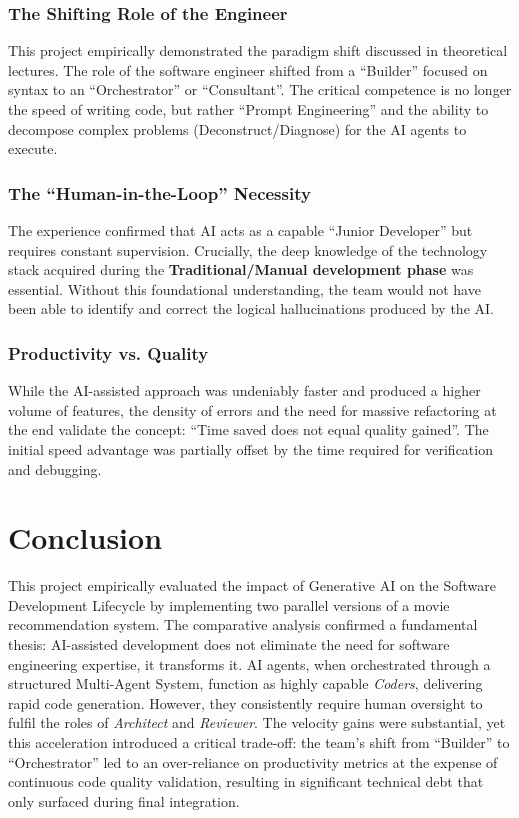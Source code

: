 \documentclass[a4paper,12pt]{report}
\begin{document}
    \subsection{The Shifting Role of the Engineer}
    This project empirically demonstrated the paradigm shift discussed in theoretical lectures. The role of the software engineer shifted from a ``Builder'' focused on syntax to an ``Orchestrator'' or ``Consultant''.
    The critical competence is no longer the speed of writing code, but rather ``Prompt Engineering'' and the ability to decompose complex problems (Deconstruct/Diagnose) for the AI agents to execute.

    \subsection{The ``Human-in-the-Loop'' Necessity}
    The experience confirmed that AI acts as a capable ``Junior Developer'' but requires constant supervision. Crucially, the deep knowledge of the technology stack acquired during the \textbf{Traditional/Manual development phase} was essential. Without this foundational understanding, the team would not have been able to identify and correct the logical hallucinations produced by the AI.

    \subsection{Productivity vs. Quality}
    While the AI-assisted approach was undeniably faster and produced a higher volume of features, the density of errors and the need for massive refactoring at the end validate the concept: ``Time saved does not equal quality gained''. The initial speed advantage was partially offset by the time required for verification and debugging.

\chapter{Conclusion}
This project empirically evaluated the impact of Generative AI on the Software Development Lifecycle by implementing two parallel versions of a movie recommendation system. The comparative analysis confirmed a fundamental thesis: AI-assisted development does not eliminate the need for software engineering expertise, it transforms it. AI agents, when orchestrated through a structured Multi-Agent System, function as highly capable \textit{Coders}, delivering rapid code generation. However, they consistently require human oversight to fulfil the roles of \textit{Architect} and \textit{Reviewer}. The velocity gains were substantial, yet this acceleration introduced a critical trade-off: the team's shift from ``Builder'' to ``Orchestrator'' led to an over-reliance on productivity metrics at the expense of continuous code quality validation, resulting in significant technical debt that only surfaced during final integration.
\end{document}
